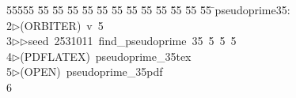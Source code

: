 %
%
\begin{tabbing}
55555 \= 55 \= 55 \= 55 \= 55 \= 55 \= 55 \= 55 \= 55 \= 55 \= 55 \= 55 \= 55 \= \>pseudoprime35:\\[0pt]
2\>$\triangleright$\>(ORBITER)\ v\ 5\ \\[0pt]
3\>$\triangleright$\>$\triangleright$\>seed\ 2531011\ find\_pseudoprime\ 35\ 5\ 5\ 5\ \\[0pt]
4\>$\triangleright$\>(PDFLATEX)\ pseudoprime\_35tex\\[0pt]
5\>$\triangleright$\>(OPEN)\ pseudoprime\_35pdf\\[0pt]
6\>\end{tabbing}
